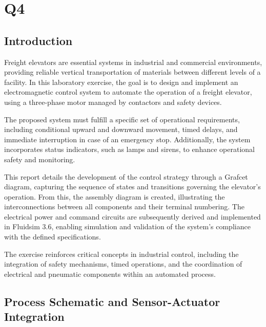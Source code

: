 \section{Q4} 

\subsection{Introduction} \label{sec:Introduction}

Freight elevators are essential systems in industrial and commercial environments, providing reliable 
vertical transportation of materials between different levels of a facility. In this laboratory exercise, 
the goal is to design and implement an electromagnetic control system to automate the operation of a freight 
elevator, using a three-phase motor managed by contactors and safety devices.

The proposed system must fulfill a specific set of operational requirements, including conditional 
upward and downward movement, timed delays, and immediate interruption in case of an emergency stop. 
Additionally, the system incorporates status indicators, such as lamps and sirens, to enhance operational 
safety and monitoring.

This report details the development of the control strategy through a Grafcet diagram, capturing the 
sequence of states and transitions governing the elevator’s operation. From this, the assembly diagram 
is created, illustrating the interconnections between all components and their terminal numbering. The 
electrical power and command circuits are subsequently derived and implemented in Fluidsim 3.6, enabling 
simulation and validation of the system’s compliance with the defined specifications.

The exercise reinforces critical concepts in industrial control, including the integration of safety 
mechanisms, timed operations, and the coordination of electrical and pneumatic components within an 
automated process.

\subsection{Process Schematic and Sensor-Actuator Integration} \label{sec:Process_Schematic_and_Sensor-Actuator_Integration}

